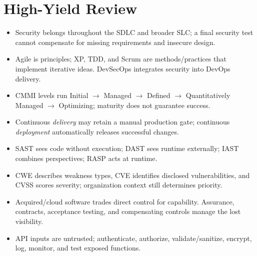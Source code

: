 \documentclass[10pt,letterpaper]{article}
\begin{document}
\section{High-Yield Review}
\begin{itemize}
\item Security belongs throughout the SDLC and broader SLC; a final security test cannot compensate for missing requirements and insecure design.
\item Agile is principles; XP, TDD, and Scrum are methods/practices that implement iterative ideas. DevSecOps integrates security into DevOps delivery.
\item CMMI levels run Initial $\rightarrow$ Managed $\rightarrow$ Defined $\rightarrow$ Quantitatively Managed $\rightarrow$ Optimizing; maturity does not guarantee success.
\item Continuous \emph{delivery} may retain a manual production gate; continuous \emph{deployment} automatically releases successful changes.
\item SAST sees code without execution; DAST sees runtime externally; IAST combines perspectives; RASP acts at runtime.
\item CWE describes weakness types, CVE identifies disclosed vulnerabilities, and CVSS scores severity; organization context still determines priority.
\item Acquired/cloud software trades direct control for capability. Assurance, contracts, acceptance testing, and compensating controls manage the lost visibility.
\item API inputs are untrusted; authenticate, authorize, validate/sanitize, encrypt, log, monitor, and test exposed functions.
\end{itemize}
\end{document}
